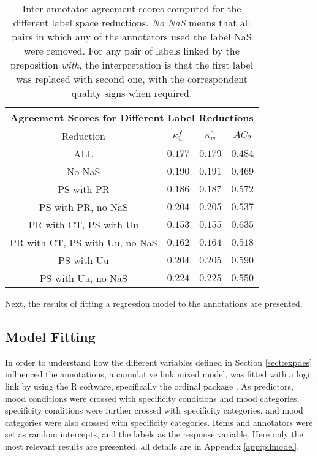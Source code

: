 \begin{table}
\centering
\begin{tabular}{|c|c|c|c|}
\hline
\multicolumn{4}{|c|}{Agreement Scores for Different Label Reductions}\\\hline
Reduction &  $\kappa^{f}_{w}$ & $\kappa^{c}_{w}$ & $AC_2$\\\hline
ALL & $0.177$ & $0.179$ & $0.484$\\\hline
No NaS & $0.190$ & $0.191$ & $0.469$ \\\hline
PS with PR & $0.186$ & $0.187$ & $0.572$\\\hline
PS with PR, no NaS & $0.204$ & $0.205$ & $0.537$\\\hline
PR with CT, PS with Uu & $0.153$ & $0.155$ & $0.635$\\\hline
PR with CT, PS with Uu, no NaS & $0.162$ & $0.164$ & $0.518$\\\hline
PS with Uu & $0.204$ & $0.205$ & $0.590$\\\hline
PS with Uu, no NaS & $0.224$ & $0.225$ & $0.550$\\\hline 
\end{tabular}
\caption[Inter-annotator agreement scores for different label reductions.]{Inter-annotator agreement scores computed for the different label space reductions. \textit{No NaS} means that all pairs in which any of the annotators used the label NaS were removed. For any pair of labels linked by the preposition \textit{with}, the interpretation is that the first label was replaced with second one, with the correspondent quality signs when required.}
\label{tab:rediaa}
\end{table}

Next, the results of fitting a regression model to the annotations are presented.

\subsection{Model Fitting}
In order to understand how the different variables defined in Section \ref{sect:expdes} influenced the annotations, a cumulative link mixed model, was fitted with a logit link by using the R software, specifically the ordinal package \citep{christensen2018cumulative}. As predictors, mood conditions were crossed with specificity conditions and mood categories, specificity conditions were further crossed with specificity categories, and mood categories were also crossed with specificity categories. Items and annotators were set as random intercepts, and the labels as the response variable. Here only the most relevant results are presented, all details are in Appendix \ref{app:pilmodel}.\\

